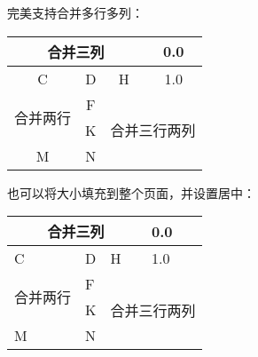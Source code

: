     完美支持合并多行多列：
    \begin{texshow}
        \begin{tabular}{|c|c|c|c|}
            \hline
            \multicolumn{3}{|c|}{合并三列}&0.0\\
            \hline
            C&D&H&1.0\\
            \hline
            \multirow{2}{*}{合并两行}&F&\multicolumn{2}{c|}{\multirow{3}{*}{合并三行两列}}\\
            \cline{2-2}
            &K&\multicolumn{2}{c|}{}\\
            \cline{1-2}
            M&N&\multicolumn{2}{c|}{}\\
            \hline
        \end{tabular}
    \end{texshow}
    
    也可以将大小填充到整个页面，并设置居中：
    \begin{texshow}
        \begin{center}
            \setlength\tablewidth{\dimexpr (\textwidth -8\tabcolsep)}
            \begin{table}[H]
                \begin{tabular}{|p{0.29\tablewidth}<{\centering}|
                    p{0.07\tablewidth}<{\centering}|
                    p{0.43\tablewidth}<{\centering}|
                    p{0.21\tablewidth}<{\centering}|}
                    \hline
                    \multicolumn{3}{|c|}{合并三列}&0.0\\
                    \hline
                    C&D&H&1.0\\
                    \hline
                    \multirow{2}{*}{合并两行}&F&\multicolumn{2}{c|}{\multirow{3}{*}{合并三行两列}}\\
                    \cline{2-2}
                    &K&\multicolumn{2}{c|}{}\\
                    \cline{1-2}
                    M&N&\multicolumn{2}{c|}{}\\
                    \hline
                \end{tabular}
            \end{table}
        \end{center}
    \end{texshow}



    
    